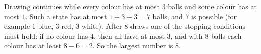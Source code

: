 Drawing continues while every colour has at most $3$ balls and some colour has at most $1$. Such a state has at most $1+3+3=7$ balls, and $7$ is possible (for example $1$ blue, $3$ red, $3$ white). After $8$ draws one of the stopping conditions must hold: if no colour has $4$, then all have at most $3$, and with $8$ balls each colour has at least $8-6=2$. So the largest number is $\boxed{8}$.
